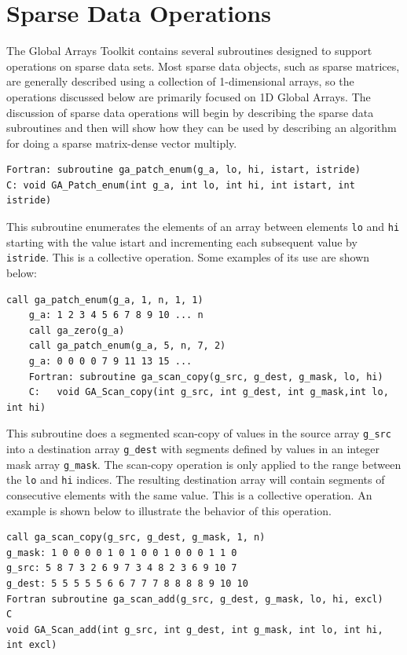 \chapter{Sparse Data Operations}

The Global Arrays Toolkit contains several subroutines designed to
support operations on sparse data sets. Most sparse data objects,
such as sparse matrices, are generally described using a collection
of 1-dimensional arrays, so the operations discussed below are primarily
focused on 1D Global Arrays. The discussion of sparse data operations
will begin by describing the sparse data subroutines and then will
show how they can be used by describing an algorithm for doing a sparse
matrix-dense vector multiply.
\begin{lstlisting}[style=cppnoframe]
Fortran: subroutine ga_patch_enum(g_a, lo, hi, istart, istride)
C: void GA_Patch_enum(int g_a, int lo, int hi, int istart, int istride)
\end{lstlisting}

\noindent This subroutine enumerates the elements of an array between elements
\texttt{lo} and \texttt{hi} starting with the value istart and incrementing
each subsequent value by \texttt{istride}. This is a collective operation.
Some examples of its use are shown below:
\begin{lstlisting}[style=cpp]
    call ga_patch_enum(g_a, 1, n, 1, 1)
    g_a: 1 2 3 4 5 6 7 8 9 10 ... n
    call ga_zero(g_a)
    call ga_patch_enum(g_a, 5, n, 7, 2)
    g_a: 0 0 0 0 7 9 11 13 15 ...
    Fortran: subroutine ga_scan_copy(g_src, g_dest, g_mask, lo, hi)
    C:   void GA_Scan_copy(int g_src, int g_dest, int g_mask,int lo, int hi)
\end{lstlisting}

This subroutine does a segmented scan-copy of values in the source
array \texttt{g\_src} into a destination array \texttt{g\_dest} with
segments defined by values in an integer mask array \texttt{g\_mask}.
The scan-copy operation is only applied to the range between the \texttt{lo}
and \texttt{hi} indices. The resulting destination array will contain
segments of consecutive elements with the same value. This is a collective
operation. An example is shown below to illustrate the behavior of
this operation. 

\begin{lstlisting}[style=cppnoframe]
call ga_scan_copy(g_src, g_dest, g_mask, 1, n)
g_mask: 1 0 0 0 0 1 0 1 0 0 1 0 0 0 1 1 0
g_src: 5 8 7 3 2 6 9 7 3 4 8 2 3 6 9 10 7
g_dest: 5 5 5 5 5 6 6 7 7 7 8 8 8 8 9 10 10
Fortran subroutine ga_scan_add(g_src, g_dest, g_mask, lo, hi, excl)
C
void GA_Scan_add(int g_src, int g_dest, int g_mask, int lo, int hi, int excl)
\end{lstlisting}

